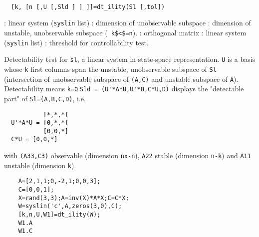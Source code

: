 \begin{mandesc}
   \\ %
\end{mandesc}
\begin{calling_sequence}
\begin{verbatim}
  [k, [n [,U [,Sld ] ] ]]=dt_ility(Sl [,tol])  
\end{verbatim}
\end{calling_sequence}
\begin{parameters}
  \begin{varlist}
    : linear system (\verb!syslin! list)
    : dimension of unobservable subspace
    : dimension of unstable, unobservable subspace (\verb! k$<$=n!).
    : orthogonal matrix
    : linear system (\verb!syslin! list)
    : threshold for controllability test.
  \end{varlist}
\end{parameters}
\begin{mandescription}
  Detectability test for \verb!sl!, a linear system in state-space
  representation.  \verb!U! is a basis whose \verb!k! first columns span the
  unstable, unobservable subspace of \verb!Sl! (intersection of unobservable
  subspace of \verb!(A,C)! and unstable subspace of \verb!A!). Detectability
  means \verb!k=0!.\verb!Sld = (U'*A*U,U'*B,C*U,D)! displays the "detectable
  part" of \verb!Sl=(A,B,C,D)!, i.e.
\begin{verbatim}
           [*,*,*]
  U'*A*U = [0,*,*]
           [0,0,*]
  C*U = [0,0,*]
\end{verbatim}
with \verb!(A33,C3)! observable (dimension \verb!nx-n!), \verb!A22! stable 
(dimension \verb!n-k!) and \verb!A11! unstable (dimension \verb!k!).
\end{mandescription}
\begin{examples}
  \begin{Verbatim}
    A=[2,1,1;0,-2,1;0,0,3];
    C=[0,0,1];
    X=rand(3,3);A=inv(X)*A*X;C=C*X;
    W=syslin('c',A,zeros(3,0),C);
    [k,n,U,W1]=dt_ility(W);
    W1.A
    W1.C
  \end{Verbatim}
\end{examples}
\begin{manseealso}
       
\end{manseealso}
